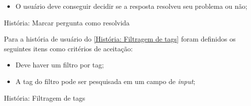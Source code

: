 \begin{itemize}
\item O usuário deve conseguir decidir se a resposta resolveu seu problema ou não;
\end{itemize}

\def\arraystretch{2}
\begin{quadro}[htb]
\centering
\ABNTEXfontereduzida
\caption[História: Marcar pergunta como resolvida]{História: Marcar pergunta como resolvida}
\label{História: Marcar pergunta como resolvida}
\end{quadro}
\FloatBarrier 

Para a história de usuário do \autoref{História: Filtragem de tags} foram definidos os seguintes itens como critérios de aceitação:

\begin{itemize}
\item Deve haver um filtro por tag;
\item A tag do filtro pode ser pesquisada em um campo de \textit{input}; 
\end{itemize}

\def\arraystretch{2}
\begin{quadro}[htb]
\centering
\ABNTEXfontereduzida
\caption[História: Filtragem de tags]{História: Filtragem de tags}
\label{História: Filtragem de tags}
\end{quadro}
\FloatBarrier 

